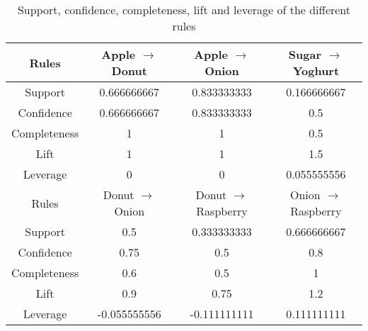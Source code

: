 \documentclass[fontsize=12pt, usenames, dvipsnames, headinclude, headsepline, footinclude, footsepline]{scrartcl}
\begin{document}
\begin{table}[h]
\centering
\caption{Support, confidence, completeness, lift and leverage of the different rules}
\label{table:1}
{ \footnotesize
\begin{tabular}{@{}c|ccc@{}}
\toprule
Rules        & Apple $\to$ Donut & Apple $\to$ Onion     & Sugar $\to$ Yoghurt   \\ \midrule
Support      & 0.666666667               & 0.833333333                   & 0.166666667                   \\
Confidence   & 0.666666667               & 0.833333333                   & 0.5                           \\
Completeness & 1                         & 1                             & 0.5                           \\
Lift         & 1                         & 1                             & 1.5                           \\
Leverage     & 0                         & 0                             & 0.055555556                   \\ \toprule
Rules        & Donut $\to$ Onion & Donut $\to$ Raspberry & Onion $\to$ Raspberry \\ \midrule
Support      & 0.5                       & 0.333333333                   & 0.666666667                   \\
Confidence   & 0.75                      & 0.5                           & 0.8                           \\
Completeness & 0.6                       & 0.5                           & 1                             \\
Lift         & 0.9                       & 0.75                          & 1.2                           \\
Leverage     & -0.055555556              & -0.111111111                  & 0.111111111                   \\ \bottomrule
\end{tabular}
}
\end{table}

	
\end{document}

